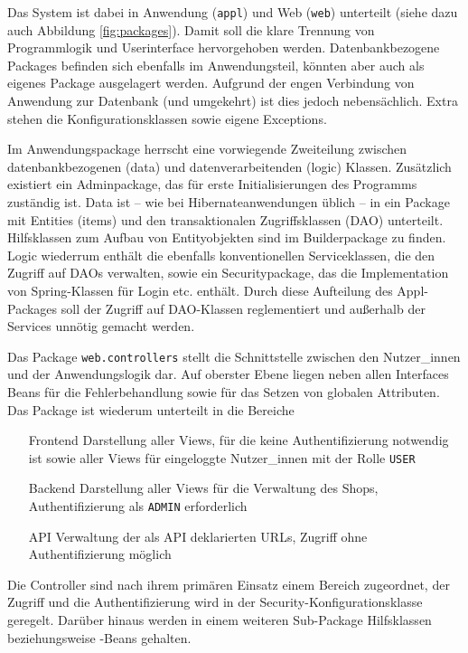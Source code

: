 Das System ist dabei in Anwendung (\lstinline|appl|) und Web (\lstinline|web|) unterteilt (siehe dazu auch Abbildung \ref{fig:packages}). Damit soll die klare Trennung von Programmlogik und Userinterface hervorgehoben werden. Datenbankbezogene Packages befinden sich ebenfalls im Anwendungsteil, könnten aber auch als eigenes Package ausgelagert werden. Aufgrund der engen Verbindung von Anwendung zur Datenbank (und umgekehrt) ist dies jedoch nebensächlich. Extra stehen die Konfigurationsklassen sowie eigene Exceptions.

Im Anwendungspackage herrscht eine vorwiegende Zweiteilung zwischen datenbankbezogenen (data) und datenverarbeitenden (logic) Klassen. Zusätzlich existiert ein Adminpackage, das für erste Initialisierungen des Programms zuständig ist. Data ist -- wie bei Hibernateanwendungen üblich -- in ein Package mit Entities (items) und den transaktionalen Zugriffsklassen (DAO) unterteilt. Hilfsklassen zum Aufbau von Entityobjekten sind im Builderpackage zu finden. Logic wiederrum enthält die ebenfalls konventionellen Serviceklassen, die den Zugriff auf DAOs verwalten, sowie ein Securitypackage, das die Implementation von Spring-Klassen für Login etc. enthält. Durch diese Aufteilung des Appl-Packages soll der Zugriff auf DAO-Klassen reglementiert und außerhalb der Services unnötig gemacht werden.

Das Package \lstinline|web.controllers| stellt die Schnittstelle zwischen den Nutzer\_innen und der Anwendungslogik dar. Auf oberster Ebene liegen neben allen Interfaces Beans für die Fehlerbehandlung sowie für das Setzen von globalen Attributen. Das Package ist wiederum unterteilt in die Bereiche
\begin{itemize}
	\item[Frontend] Darstellung aller Views, für die keine Authentifizierung notwendig ist sowie aller Views für eingeloggte Nutzer\_innen mit der Rolle \lstinline|USER|
	\item[Backend] Darstellung aller Views für die Verwaltung des Shops, Authentifizierung als \lstinline|ADMIN| erforderlich
	\item[API] Verwaltung der als API deklarierten URLs, Zugriff ohne Authentifizierung möglich
\end{itemize}
Die Controller sind nach ihrem primären Einsatz einem Bereich zugeordnet, der Zugriff und die Authentifizierung wird in der Security-Konfigurationsklasse geregelt. Darüber hinaus werden in einem weiteren Sub-Package Hilfsklassen beziehungsweise -Beans gehalten.

